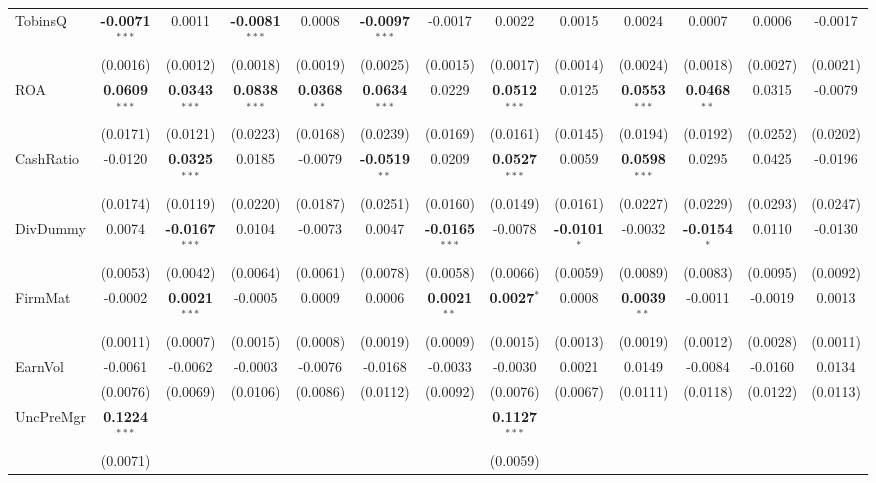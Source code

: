\documentclass[11pt,a4paper]{article}
\begin{document}
\begin{table}[htbp]
\begin{tabular}{lcccccccccccc}
TobinsQ & \textbf{-0.0071}$^{***}$ & 0.0011 & \textbf{-0.0081}$^{***}$ & 0.0008 & \textbf{-0.0097}$^{***}$ & -0.0017 & 0.0022 & 0.0015 & 0.0024 & 0.0007 & 0.0006 & -0.0017 \\
 & (0.0016) & (0.0012) & (0.0018) & (0.0019) & (0.0025) & (0.0015) & (0.0017) & (0.0014) & (0.0024) & (0.0018) & (0.0027) & (0.0021) \\
ROA & \textbf{0.0609}$^{***}$ & \textbf{0.0343}$^{***}$ & \textbf{0.0838}$^{***}$ & \textbf{0.0368}$^{**}$ & \textbf{0.0634}$^{***}$ & 0.0229 & \textbf{0.0512}$^{***}$ & 0.0125 & \textbf{0.0553}$^{***}$ & \textbf{0.0468}$^{**}$ & 0.0315 & -0.0079 \\
 & (0.0171) & (0.0121) & (0.0223) & (0.0168) & (0.0239) & (0.0169) & (0.0161) & (0.0145) & (0.0194) & (0.0192) & (0.0252) & (0.0202) \\
CashRatio & -0.0120 & \textbf{0.0325}$^{***}$ & 0.0185 & -0.0079 & \textbf{-0.0519}$^{**}$ & 0.0209 & \textbf{0.0527}$^{***}$ & 0.0059 & \textbf{0.0598}$^{***}$ & 0.0295 & 0.0425 & -0.0196 \\
 & (0.0174) & (0.0119) & (0.0220) & (0.0187) & (0.0251) & (0.0160) & (0.0149) & (0.0161) & (0.0227) & (0.0229) & (0.0293) & (0.0247) \\
DivDummy & 0.0074 & \textbf{-0.0167}$^{***}$ & 0.0104 & -0.0073 & 0.0047 & \textbf{-0.0165}$^{***}$ & -0.0078 & \textbf{-0.0101}$^{*}$ & -0.0032 & \textbf{-0.0154}$^{*}$ & 0.0110 & -0.0130 \\
 & (0.0053) & (0.0042) & (0.0064) & (0.0061) & (0.0078) & (0.0058) & (0.0066) & (0.0059) & (0.0089) & (0.0083) & (0.0095) & (0.0092) \\
FirmMat & -0.0002 & \textbf{0.0021}$^{***}$ & -0.0005 & 0.0009 & 0.0006 & \textbf{0.0021}$^{**}$ & \textbf{0.0027}$^{*}$ & 0.0008 & \textbf{0.0039}$^{**}$ & -0.0011 & -0.0019 & 0.0013 \\
 & (0.0011) & (0.0007) & (0.0015) & (0.0008) & (0.0019) & (0.0009) & (0.0015) & (0.0013) & (0.0019) & (0.0012) & (0.0028) & (0.0011) \\
EarnVol & -0.0061 & -0.0062 & -0.0003 & -0.0076 & -0.0168 & -0.0033 & -0.0030 & 0.0021 & 0.0149 & -0.0084 & -0.0160 & 0.0134 \\
 & (0.0076) & (0.0069) & (0.0106) & (0.0086) & (0.0112) & (0.0092) & (0.0076) & (0.0067) & (0.0111) & (0.0118) & (0.0122) & (0.0113) \\
UncPreMgr & \textbf{0.1224}$^{***}$ &  &  &  &  &  & \textbf{0.1127}$^{***}$ &  &  &  &  &  \\
 & (0.0071) &  &  &  &  &  & (0.0059) &  &  &  &  &  \\

\end{tabular}
\end{table}
\end{document}

